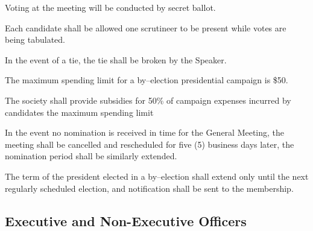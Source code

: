 \begin{longenum}[ label*=\thesubsection.\arabic*., align=left]
	\item Voting at the meeting will be conducted by secret ballot.
	\item Each candidate shall be allowed one scrutineer to be present while votes are being tabulated.
	\item In the event of a tie, the tie shall be broken by the Speaker.
	\item The maximum spending limit for a by--election presidential campaign is \$50.
	\item The society shall provide subsidies for 50\% of campaign expenses incurred by candidates the maximum spending limit
	\item In the event no nomination is received in time for the General Meeting, the meeting shall be cancelled and rescheduled for five (5) business days later, the nomination period shall be similarly extended.
	\item The term of the president elected in a by--election shall extend only until the next regularly scheduled election, and notification shall be sent to the membership.
\end{longenum}

\subsection{Executive and Non-Executive Officers}

